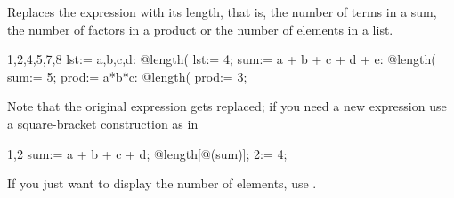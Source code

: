 
Replaces the expression with its length, that is, the number of terms
in a sum, the number of factors in a product or the number of
elements in a list.
\begin{screen}{1,2,4,5,7,8}
lst:= {a,b,c,d}:
@length(%
lst:= 4;
sum:= a + b + c + d + e:
@length(%
sum:= 5;
prod:= a*b*c:
@length(%
prod:= 3;
\end{screen}
Note that the original expression gets replaced; if you need a new
expression use a square-bracket construction as in
\begin{screen}{1,2}
sum:= a + b + c + d;
@length[@(sum)];
2:= 4;
\end{screen}
If you just want to display the number of elements, use
.

